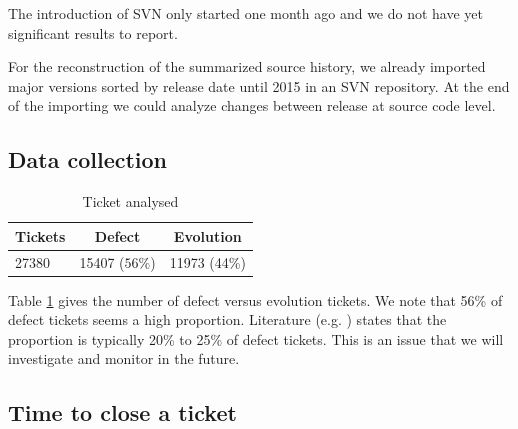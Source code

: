 \documentclass[10pt,conference]{IEEEtran}
\begin{document}
The introduction of SVN only started one month ago and we do not have yet significant results to report. 

For the reconstruction of the summarized source history, we already imported major versions sorted by release date until 2015 in an SVN repository. 
At the end of the importing we could analyze changes between release at source code level.

\subsection{Data collection}

\begin{table}[htbp]
  \begin{center}
    \caption{Ticket analysed}
    \label{tab:proportion}
    \begin{tabular}{| l | c |c|}
      \hline
      Tickets & Defect  & Evolution  \\
      \hline
      27380&15407 ($56\%$)&11973 (44\%)\\
      \hline 
    \end{tabular}
  \end{center}  
\end{table}

Table \ref{tab:proportion} gives the number of defect versus evolution tickets.
We note that 56\% of defect tickets seems a high proportion.
Literature (e.g. \citep*{Pigo96a} ) states that the proportion is typically 20\% to 25\% of defect tickets.
This is an issue that we will investigate and monitor in the future.

\subsection{Time to close a ticket}
\end{document}
